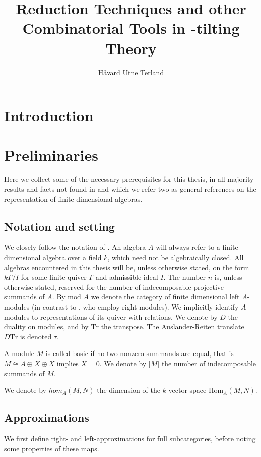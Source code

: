 \documentclass[]{article}
\title{Reduction Techniques and other Combinatorial Tools in \tu-tilting Theory}
\author{Håvard Utne Terland}
\theoremstyle{definition}
\newcommand{\mo}{\ensuremath{\text{mod }}}
\begin{document}
\maketitle

\begin{abstract}

\end{abstract}

\section{Introduction}


\section{Preliminaries}
Here we collect some of the necessary prerequisites for this thesis, in all majority results and facts not found in \cite{auslander_reiten_smalo_1995} and \cite{assem_skowronski_simson_2006} which we refer two as general references on the representation of finite dimensional algebras.

\subsection{Notation and setting}
We closely follow the notation of \cite{assem_skowronski_simson_2006}. An algebra $A$ will always refer to a finite dimensional algebra over a field $k$, which need not be algebraically closed. All algebras encountered in this thesis will be, unless otherwise stated, on the form $k\Gamma/I$ for some finite quiver $\Gamma$ and admissible ideal $I$. The number $n$ is, unless otherwise stated, reserved for the number of indecomposable projective summands of $A$. By $\mo A$ we denote the category of finite dimensional left $A$-modules (in contrast to \cite{assem_skowronski_simson_2006}, who employ right modules). We implicitly identify $A$-modules to representations of its quiver with relations. We denote by $D$ the duality on modules, and by $\text{Tr}$ the transpose. The Auslander-Reiten translate $D\text{Tr}$ is denoted $\tau$.

A module $M$ is called basic if no two nonzero summands are equal, that is $M \cong A \oplus X \oplus X$ implies $X = 0$. We denote by $|M|$ the number of indecomposable summands of $M$. 

We denote by $hom_A(M,N)$ the dimension of the $k$-vector space $\text{Hom}_A(M,N)$.

\subsection{Approximations}
We first define right- and left-approximations for full subcategories, before noting some properties of these maps.
\end{document}
